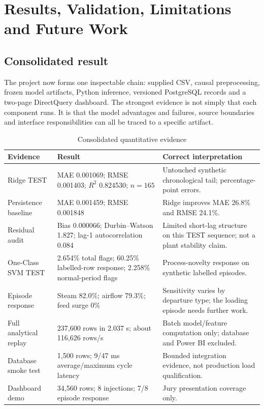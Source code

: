 \chapter{Results, Validation, Limitations and Future Work}
\label{chap:validation}

\section{Consolidated result}

The project now forms one inspectable chain: supplied CSV, causal preprocessing, frozen model artifacts, Python inference, versioned PostgreSQL records and a two-page DirectQuery dashboard. The strongest evidence is not simply that each component runs. It is that the model advantages and failures, source boundaries and interface responsibilities can all be traced to a specific artifact.

\begin{table}[htbp]
\centering\scriptsize
\caption{Consolidated quantitative evidence}
\label{tab:results-summary}
\begin{tabularx}{\textwidth}{@{}p{}p{}Y@{}}
\toprule
Evidence & Result & Correct interpretation \\
\midrule
Ridge TEST & MAE 0.001069; RMSE 0.001403; $R^2$ 0.824530; $n=165$ & Untouched synthetic chronological tail; percentage-point errors. \\
Persistence baseline & MAE 0.001459; RMSE 0.001848 & Ridge improves MAE 26.8\% and RMSE 24.1\%. \\
Residual audit & Bias 0.000066; Durbin--Watson 1.827; lag-1 autocorrelation 0.084 & Limited short-lag structure on this TEST sequence; not a plant stability claim. \\
One-Class SVM TEST & 2.654\% total flags; 60.25\% labelled-row response; 2.258\% normal-period flags & Process-novelty response on synthetic labelled episodes. \\
Episode response & Steam 82.0\%; airflow 79.3\%; feed surge 0\% & Sensitivity varies by departure type; the loading episode needs further work. \\
Full analytical replay & 237,600 rows in 2.037 s; about 116,626 rows/s & Batch model/feature computation only; database and Power BI excluded. \\
Database smoke test & 1,500 rows; 9/47 ms average/maximum cycle latency & Bounded integration evidence, not production load qualification. \\
Dashboard demo & 34,560 rows; 8 injections; 7/8 episode response & Jury presentation coverage only. \\
\bottomrule
\end{tabularx}
\end{table}

